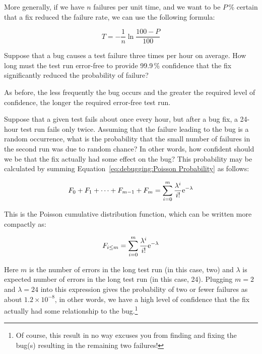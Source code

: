 More generally, if we have $n$ failures per unit time, and we want to
be $P$\,\% certain that a fix reduced the failure rate, we can use the
following formula:

\begin{equation}
	T = - \frac{1}{n} \ln \frac{100 - P}{100}
\label{eq:debugging:Error-Free Test Duration}
\end{equation}

\QuickQuiz{}
	Suppose that a bug causes a test failure three times per hour
	on average.
	How long must the test run error-free to provide 99.9\,\%
	confidence that the fix significantly reduced the probability
	of failure?
 \QuickQuizEnd

As before, the less frequently the bug occurs and the greater the
required level of confidence, the longer the required error-free test run.

Suppose that a given test fails about once every hour, but after a bug
fix, a 24-hour test run fails only twice.
Assuming that the failure leading to the bug is a random occurrence,
what is the probability that the small number of
failures in the second run was due to random chance?
In other words, how confident should we be that the fix actually
had some effect on the bug?
This probability may be calculated by summing
Equation~\ref{eq:debugging:Poisson Probability} as follows:

\begin{equation}
	F_0 + F_1 + \dots + F_{m - 1} + F_m =
		\sum_{i=0}^m \frac{\lambda^i}{i!} \mathrm{e}^{-\lambda}
\end{equation}

This is the Poisson cumulative distribution function, which can be
written more compactly as:

\begin{equation}
	F_{i \le m} = \sum_{i=0}^m \frac{\lambda^i}{i!} \mathrm{e}^{-\lambda}
\label{eq:debugging:Possion CDF}
\end{equation}

Here $m$ is the number of errors in the long test run
(in this case, two) and $\lambda$ is expected number of errors
in the long test run (in this case, 24).
Plugging $m=2$ and $\lambda=24$ into this expression gives the probability
of two or fewer failures as about
$1.2 \times 10^{-8}$, in other words, we have a high level of confidence
that the fix actually had some relationship to the bug.\footnote{
	Of course, this result in no way excuses you from finding and
	fixing the bug(s) resulting in the remaining two failures!}

